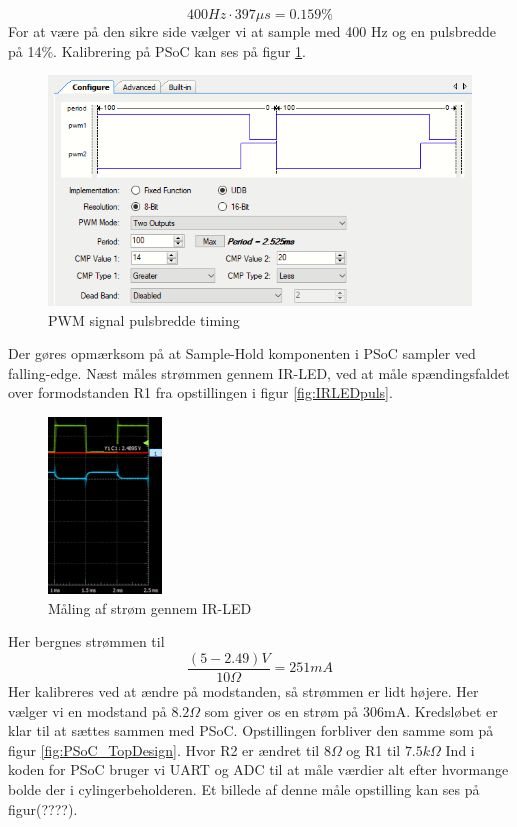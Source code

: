\documentclass[Rapport/Rapport_main.tex]{subfiles}
\begin{document}
$$400Hz\cdot 397\mu s=0.159\%$$
For at være på den sikre side vælger vi at sample med 400 Hz og en pulsbredde på 14\%. Kalibrering på PSoC kan ses på figur \ref{fig:PWM_timing}.
\begin{figure}[H]
    \centering
    \includegraphics[width=1\textwidth]{Rapport/BallDispenser/BallCountSensor/graphics/PWM_timing.png}
    \caption{PWM signal pulsbredde timing}
    \label{fig:PWM_timing}
\end{figure}
Der gøres opmærksom på at Sample-Hold komponenten i PSoC sampler ved falling-edge. Næst måles strømmen gennem IR-LED, ved at måle spændingsfaldet over formodstanden R1 fra opstillingen i figur \ref{fig:IRLEDpuls}.
\begin{figure}[H]
    \centering
    \includegraphics[width=0.27\textwidth]{Rapport/BallDispenser/BallCountSensor/graphics/Maling2.png}
    \caption{Måling af strøm gennem IR-LED}
    \label{fig:Måling2_AD}
\end{figure}
Her bergnes strømmen til 
$$\frac{(5-2.49)V}{10\Omega}=251mA$$
Her kalibreres ved at ændre på modstanden, så strømmen er lidt højere. Her vælger vi en modstand på $8.2\Omega$ som giver os en strøm på 306mA.
Kredsløbet er klar til at sættes sammen med PSoC. Opstillingen forbliver den samme som på figur \ref{fig:PSoC_TopDesign}. Hvor R2 er ændret til $8\Omega$ og R1 til $7.5k\Omega$
Ind i koden for PSoC bruger vi UART og ADC til at måle værdier alt efter hvormange bolde der i cylingerbeholderen. Et billede af denne måle opstilling kan ses på figur(????).
\end{document}

